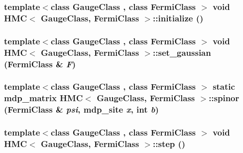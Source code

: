 \label{class_h_m_c_a278a4514882a4b585797364c6c7c1ba2}
\hypertarget{class_h_m_c_a796aa70365c8befa06b6e9a6064b332d}{
\subsubsection[{initialize}]{\setlength{\rightskip}{0pt plus 5cm}template$<$class GaugeClass , class FermiClass $>$ void {\bf HMC}$<$ GaugeClass, FermiClass $>$::initialize ()}}
\label{class_h_m_c_a796aa70365c8befa06b6e9a6064b332d}
\hypertarget{class_h_m_c_af2e951741710132d0bca8bc9d7fdd463}{
\subsubsection[{set\_\-gaussian}]{\setlength{\rightskip}{0pt plus 5cm}template$<$class GaugeClass , class FermiClass $>$ void {\bf HMC}$<$ GaugeClass, FermiClass $>$::set\_\-gaussian (FermiClass \& {\em F})}}
\label{class_h_m_c_af2e951741710132d0bca8bc9d7fdd463}
\hypertarget{class_h_m_c_a95adca9cab9649becfe31b5f346713d9}{
\subsubsection[{spinor}]{\setlength{\rightskip}{0pt plus 5cm}template$<$class GaugeClass , class FermiClass $>$ static {\bf mdp\_\-matrix} {\bf HMC}$<$ GaugeClass, FermiClass $>$::spinor (FermiClass \& {\em psi}, \/  {\bf mdp\_\-site} {\em x}, \/  int {\em b})}}
\label{class_h_m_c_a95adca9cab9649becfe31b5f346713d9}
\hypertarget{class_h_m_c_a97646bc15efc4db6c69e52f19f058ccd}{
\subsubsection[{step}]{\setlength{\rightskip}{0pt plus 5cm}template$<$class GaugeClass , class FermiClass $>$ void {\bf HMC}$<$ GaugeClass, FermiClass $>$::step ()}}
\label{class_h_m_c_a97646bc15efc4db6c69e52f19f058ccd}


